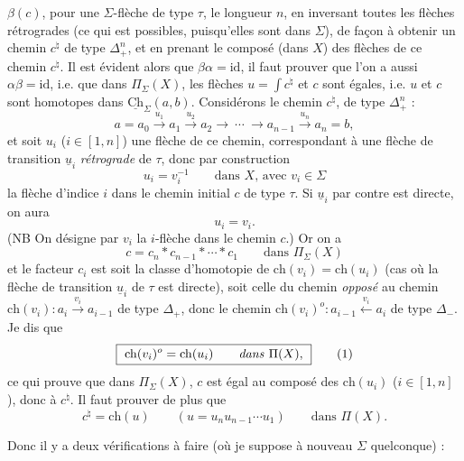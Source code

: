 \documentclass[11pt]{article}
\newcommand{\msp}[1]{\marginpar{\footnotesize [#1]}}
\newcommand{\Ch}{\underline{\mathrm{Ch}}}
\newcommand{\ch}{\mathrm{ch}}
\newcommand{\id}{\mathrm{id}}
\begin{document}
$\beta(c)$, pour une $\Sigma$-flèche de type $\tau$, le longueur $n$, en inversant toutes les flèches rétrogrades (ce qui est possibles, puisqu'elles sont dans $\Sigma$), de façon à obtenir un chemin $c^\natural$ de type $\Delta_+^n$, et en prenant le composé (dans $X$) des flèches de ce chemin $c^\natural$. Il est évident alors que $\beta\alpha = \id$, il faut prouver que l'on a aussi $\alpha\beta = \id$, i.e. que dans $\Pi_\Sigma(X)$, les flèches $u = \int c^\natural$ et $c$ sont égales, i.e. $u$ et $c$ sont homotopes dans $\Ch_\Sigma(a,b)$. Considérons le chemin $c^\natural$, de type $\Delta_+^n$ : %
\[
a = a_0 \xrightarrow{u_1} a_1 \xrightarrow{u_2} a_2 \longrightarrow \ \cdots \ \longrightarrow a_{n-1} \xrightarrow{u_n} a_n = b,
\]
et soit $u_i$ ($i \in [1,n]$) une flèche de ce chemin, correspondant à une flèche de transition $\underline{u}_i$ \textit{rétrograde} de $\tau$, donc par construction
\[
u_i = v_i^{-1} \qquad \text{dans } X\text{, avec } v_i \in \Sigma
\]
la flèche d'indice $i$ dans le chemin initial $c$ de type $\tau$. Si $\underline{u}_i$ par contre est directe, on aura
\[
u_i = v_i.
\]
(NB On désigne par $v_i$ la $i$-flèche dans le chemin $c$.) Or on a
\[
c = c_n * c_{n-1} * \cdots * c_1 \qquad \text{dans } \Pi_\Sigma(X)
\tag*{$(*)$}
\]
et le facteur $c_i$ est soit la classe d'homotopie de $\ch(v_i) = \ch(u_i)$ (cas où la flèche de transition $\underline{u}_i$ de $\tau$ est directe), soit celle du chemin \textit{opposé} au chemin $\ch(v_i) : a_i \xrightarrow{v_i} a_{i-1}$ de type $\Delta_+$, donc le chemin $\ch(v_i)^o : a_{i-1} \xleftarrow{v_i} a_i$ de type $\Delta_-$. Je dis que
\[
\boxed{\ \ch(v_i)^o = \ch(u_i) \qquad \text{\textit{dans} } \Pi(X),\ }
\tag*{(1)}
\]
ce qui prouve que dans $\Pi_\Sigma(X)$, $c$ est égal au composé des $\ch(u_i)$ ($i \in [1,n]$), donc à $c^\natural$. Il faut prouver de plus que
\[
c^\natural = \ch(u) \qquad (u = u_nu_{n-1}\cdots u_1) \qquad \text{dans } \Pi(X).
\tag*{(2)}
\]

\msp{page 70}

Donc il y a deux vérifications à faire (où je suppose à nouveau $\Sigma$ quelconque) :
\end{document}
